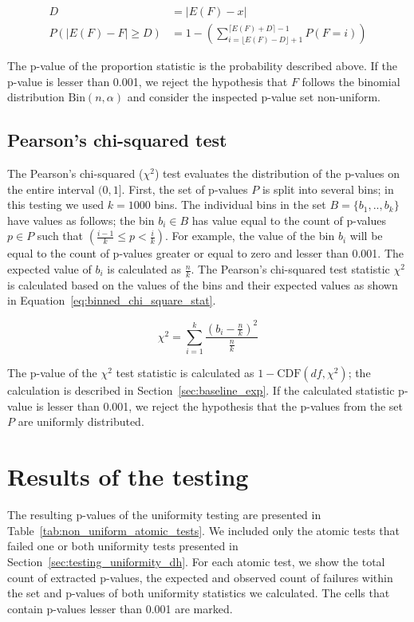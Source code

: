\documentclass[
	digital,    %
	oneside,
	color,
	11pt,
	nocover,
	notable,
	nolof,
	nolot,
]{fithesis3}
\theoremstyle{definition}
\theoremstyle{remark}
\begin{document}
\begin{align}
D &= \lvert E(F) - x \rvert \\
\label{eq:prop_statistic}
P(\lvert E(F) - F \rvert \geq D) &= 1 - \left( \sum\limits_{i=\lfloor E(F)-D \rfloor + 1}^{\lceil E(F)+D \rceil - 1} P(F = i) \right)
\end{align}

The p-value of the proportion statistic is the probability described above. If the p-value is lesser than 0.001, we reject the hypothesis that $F$ follows the binomial distribution $\text{Bin}(n,\alpha)$ and consider the inspected p-value set non-uniform.


\subsection{Pearson's chi-squared test}
The Pearson's chi-squared ($\chi^2$) test evaluates the distribution of the p-values on the entire interval $(0,1]$. First, the set of p-values $P$ is split into several bins; in this testing we used $k=1000$ bins. The individual bins in the set $B = \{b_1,..,b_k\}$ have values as follows; the bin $b_i \in B$ has value equal to the count of p-values $p \in P$ such that $\left(\frac{i-1}{k} \leq p < \frac{i}{k}\right)$. For example, the value of the bin $b_i$ will be equal to the count of p-values greater or equal to zero and lesser than 0.001. The expected value of $b_i$ is calculated as $\frac{n}{k}$. The Pearson's chi-squared test statistic $\chi^2$ is calculated based on the values of the bins and their expected values as shown in Equation~\ref{eq:binned_chi_square_stat}.

\begin{equation}
\label{eq:binned_chi_square_stat}
\chi^2 = \sum\limits_{i=1}^{k} \frac{ \left( b_i - \frac{n}{k} \right)^{2} }{\frac{n}{k}}
\end{equation}

The p-value of the $\chi^2$ test statistic is calculated as $1-\text{CDF}(df, \chi^2)$; the calculation is described in Section~\ref{sec:baseline_exp}. If the calculated statistic p-value is lesser than 0.001, we reject the hypothesis that the p-values from the set $P$ are uniformly distributed.

\section{Results of the testing}
The resulting p-values of the uniformity testing are presented in Table~\ref{tab:non_uniform_atomic_tests}. We included only the atomic tests that failed one or both uniformity tests presented in Section~\ref{sec:testing_uniformity_dh}. For each atomic test, we show the total count of extracted p-values, the expected and observed count of failures within the set and p-values of both uniformity statistics we calculated. The cells that contain p-values lesser than 0.001 are marked.
\end{document}
